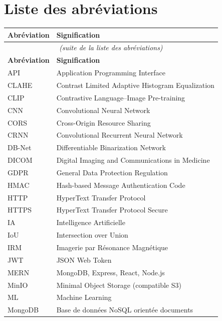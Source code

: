 \chapter*{Liste des abréviations}

\begin{longtable}{p{3.2cm} p{11cm}}
\toprule
\textbf{Abréviation} & \textbf{Signification} \\
\midrule
\endfirsthead
\multicolumn{2}{c}{\textit{(suite de la liste des abréviations)}} \\
\toprule
\textbf{Abréviation} & \textbf{Signification} \\
\midrule
\endhead
\bottomrule
\endfoot
\bottomrule
\endlastfoot
API    & Application Programming Interface \\
CLAHE  & Contrast Limited Adaptive Histogram Equalization \\
CLIP   & Contrastive Language--Image Pre-training \\
CNN    & Convolutional Neural Network \\
CORS   & Cross-Origin Resource Sharing \\
CRNN   & Convolutional Recurrent Neural Network \\
DB-Net & Differentiable Binarization Network \\
DICOM  & Digital Imaging and Communications in Medicine \\
GDPR   & General Data Protection Regulation \\
HMAC   & Hash-based Message Authentication Code \\
HTTP   & HyperText Transfer Protocol \\
HTTPS  & HyperText Transfer Protocol Secure \\
IA     & Intelligence Artificielle \\
IoU    & Intersection over Union \\
IRM    & Imagerie par Résonance Magnétique \\
JWT    & JSON Web Token \\
MERN   & MongoDB, Express, React, Node.js \\
MinIO  & Minimal Object Storage (compatible S3) \\
ML     & Machine Learning \\
MongoDB & Base de données NoSQL orientée documents \\

\end{longtable}

